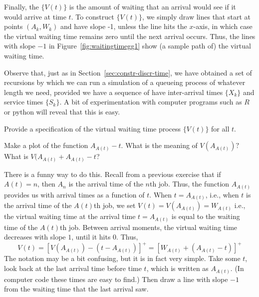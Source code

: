 Finally, the  $\{V(t)\}$ is the
amount of waiting that an arrival would see if it would arrive at time
$t$. To construct $\{V(t)\}$, we simply draw lines that start at
points $(A_k, W_k)$ and have slope -1, unless the line hits the
$x$-axis, in which case the virtual waiting time remains zero until
the next arrival occurs.  Thus, the lines with slope $-1$ in
Figure~\ref{fig:waitingtimegg1} show (a sample path of) the virtual
waiting time.


Observe that, just as in Section~\ref{sec:constr-discr-time}, we have
obtained a set of recursions by which we can run a simulation of a
queueing process of whatever length we need, provided we have a
sequence of have inter-arrival times $\{X_k\}$ and service times
$\{S_k\}$.  A bit of experimentation with computer programs such as
$R$ or python will reveal that this is easy.





\begin{exercise}
  Provide a specification of the virtual waiting time process $\{V(t)\}$ for
    all $t$.
    \begin{hint}Make a plot of the function $A_{A(t)}-t$. What is the meaning of $V(A_{A(t)})?$ What is
$V(A_{A(t)} + A_{A(t)}-t$?
    \end{hint}
    \begin{solution}
      There is a funny way to do this. Recall from a previous exercise
      that if $A(t)=n$, then $A_n$ is the arrival time of the $n$th
      job. Thus, the function $A_{A(t)}$ provides us with arrival
      times as a function of $t$. When $t=A_{A(t)}$, i.e., when $t$ is
      the arrival time of the $A(t)$th job, we set
      $V(t) = V(A_{A(t)}) = W_{A(t)}$ i.e., the virtual waiting time
      at the arrival time $t=A_{A(t)}$ is equal to the waiting time of
      the $A(t)$th job. Between arrival moments, the virtual waiting
      time decreases with slope $1$, until it hits 0.  Thus,
      \begin{equation*}
        V(t) 
= [V(A_{A(t)}) - (t-A_{A(t)})]^+= [W_{A(t)} + (A_{A(t)}-t)]^+
      \end{equation*}
      The notation may be a bit confusing, but it is in fact very
      simple. Take some $t$, look back at the last arrival time before
      time $t$, which is written as $A_{A(t)}$. (In computer code these
      times are easy to find.) Then draw a line with slope $-1$ from
      the waiting time that the last arrival saw.
    \end{solution}
\end{exercise}




